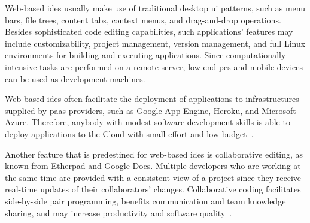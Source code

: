 Web-based \glspl{ide} usually make use of traditional desktop \gls{ui} patterns, such as menu bars, file trees, content tabs, context menus, and drag-and-drop operations. Besides sophisticated code editing capabilities, such applications' features may include customizability, project management, version management, and full Linux environments for building and executing applications. Since computationally intensive tasks are performed on a remote server, low-end \glspl{pc} and mobile devices can be used as development machines.

Web-based \glspl{ide} often facilitate the deployment of applications to infrastructures supplied by \gls{paas} providers, such as Google App Engine, Heroku, and Microsoft Azure. Therefore, anybody with modest software development skills is able to deploy applications to the Cloud with small effort and low budget~\cite{aho2011designing}.

Another feature that is predestined for web-based \glspl{ide} is collaborative editing, as known from Etherpad and Google Docs. Multiple developers who are working at the same time are provided with a consistent view of a project since they receive real-time updates of their collaborators' changes. Collaborative coding facilitates side-by-side pair programming, benefits communication and team knowledge sharing, and may increase productivity and software quality~\cite{goldman2011real}.
